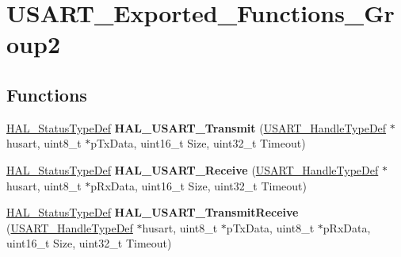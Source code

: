 \hypertarget{group___u_s_a_r_t___exported___functions___group2}{}\section{U\+S\+A\+R\+T\+\_\+\+Exported\+\_\+\+Functions\+\_\+\+Group2}
\label{group___u_s_a_r_t___exported___functions___group2}
\subsection*{Functions}
\begin{DoxyCompactItemize}
\item 
\hyperlink{stm32f4xx__hal__def_8h_a63c0679d1cb8b8c684fbb0632743478f}{H\+A\+L\+\_\+\+Status\+Type\+Def} {\bfseries H\+A\+L\+\_\+\+U\+S\+A\+R\+T\+\_\+\+Transmit} (\hyperlink{struct_u_s_a_r_t___handle_type_def}{U\+S\+A\+R\+T\+\_\+\+Handle\+Type\+Def} $\ast$husart, uint8\+\_\+t $\ast$p\+Tx\+Data, uint16\+\_\+t Size, uint32\+\_\+t Timeout)\hypertarget{group___u_s_a_r_t___exported___functions___group2_gaa80425d3a8fa74a17f74cb03a3c2ad05}{}\label{group___u_s_a_r_t___exported___functions___group2_gaa80425d3a8fa74a17f74cb03a3c2ad05}

\item 
\hyperlink{stm32f4xx__hal__def_8h_a63c0679d1cb8b8c684fbb0632743478f}{H\+A\+L\+\_\+\+Status\+Type\+Def} {\bfseries H\+A\+L\+\_\+\+U\+S\+A\+R\+T\+\_\+\+Receive} (\hyperlink{struct_u_s_a_r_t___handle_type_def}{U\+S\+A\+R\+T\+\_\+\+Handle\+Type\+Def} $\ast$husart, uint8\+\_\+t $\ast$p\+Rx\+Data, uint16\+\_\+t Size, uint32\+\_\+t Timeout)\hypertarget{group___u_s_a_r_t___exported___functions___group2_ga1da8a5ce515c18b9960d366812bf737e}{}\label{group___u_s_a_r_t___exported___functions___group2_ga1da8a5ce515c18b9960d366812bf737e}

\item 
\hyperlink{stm32f4xx__hal__def_8h_a63c0679d1cb8b8c684fbb0632743478f}{H\+A\+L\+\_\+\+Status\+Type\+Def} {\bfseries H\+A\+L\+\_\+\+U\+S\+A\+R\+T\+\_\+\+Transmit\+Receive} (\hyperlink{struct_u_s_a_r_t___handle_type_def}{U\+S\+A\+R\+T\+\_\+\+Handle\+Type\+Def} $\ast$husart, uint8\+\_\+t $\ast$p\+Tx\+Data, uint8\+\_\+t $\ast$p\+Rx\+Data, uint16\+\_\+t Size, uint32\+\_\+t Timeout)\hypertarget{group___u_s_a_r_t___exported___functions___group2_gad6da6800e21d17bd021f5d0cc068f271}{}\label{group___u_s_a_r_t___exported___functions___group2_gad6da6800e21d17bd021f5d0cc068f271}


\end{DoxyCompactItemize}
